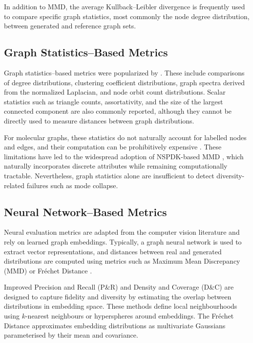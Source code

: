 In addition to MMD, the average Kullback--Leibler divergence
\citep{kullback1951information} is frequently used to compare specific graph
statistics, most commonly the node degree distribution, between generated and
reference graph sets.

\subsection{Graph Statistics--Based Metrics}

Graph statistics--based metrics were popularized by \citet{you2018graphrnn}. These include comparisons of degree distributions, clustering coefficient distributions, graph spectra derived from the normalized Laplacian, and node orbit count distributions. Scalar statistics such as triangle counts, assortativity, and the size of the largest connected component are also commonly reported, although they cannot be directly used to measure distances between graph distributions.

For molecular graphs, these statistics do not naturally account for labelled nodes and edges, and their computation can be prohibitively expensive \citep{obrady2021evaluation}. These limitations have led to the widespread adoption of NSPDK-based MMD \citep{costa2010fast,thompson2022evaluationmetricsgraphgenerative}, which naturally incorporates discrete attributes while remaining computationally tractable. Nevertheless, graph statistics alone are insufficient to detect diversity-related failures such as mode collapse.

\subsection{Neural Network--Based Metrics}

Neural evaluation metrics are adapted from the computer vision literature and rely
on learned graph embeddings. Typically, a graph neural network is used to extract
vector representations, and distances between real and generated distributions are
computed using metrics such as Maximum Mean Discrepancy (MMD) or Fréchet Distance
\citep{heusel2017gans}.

Improved Precision and Recall (P\&R) \citep{kynkaanniemi2019improved} and Density and
Coverage (D\&C) \citep{naeem2020reliable} are designed to capture fidelity and
diversity by estimating the overlap between distributions in embedding space. These
methods define local neighbourhoods using \(k\)-nearest neighbours or hyperspheres
around embeddings. The Fréchet Distance approximates embedding distributions as
multivariate Gaussians parameterised by their mean and covariance.


